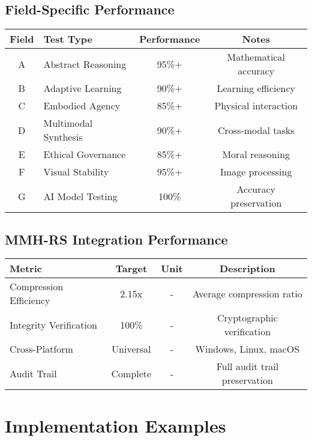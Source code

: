 \documentclass[12pt,a4paper]{article}
\begin{document}
\subsection{Field-Specific Performance}
\begin{center}
\begin{tabular}{|c|l|c|c|}
\hline
\textbf{Field} & \textbf{Test Type} & \textbf{Performance} & \textbf{Notes} \\
\hline
A & Abstract Reasoning & 95\%+ & Mathematical accuracy \\
B & Adaptive Learning & 90\%+ & Learning efficiency \\
C & Embodied Agency & 85\%+ & Physical interaction \\
D & Multimodal Synthesis & 90\%+ & Cross-modal tasks \\
E & Ethical Governance & 85\%+ & Moral reasoning \\
F & Visual Stability & 95\%+ & Image processing \\
G & AI Model Testing & 100\% & Accuracy preservation \\
\hline
\end{tabular}
\end{center}

\subsection{MMH-RS Integration Performance}
\begin{center}
\begin{tabular}{|l|c|c|c|}
\hline
\textbf{Metric} & \textbf{Target} & \textbf{Unit} & \textbf{Description} \\
\hline
Compression Efficiency & 2.15x & - & Average compression ratio \\
Integrity Verification & 100\% & - & Cryptographic verification \\
Cross-Platform & Universal & - & Windows, Linux, macOS \\
Audit Trail & Complete & - & Full audit trail preservation \\
\hline
\end{tabular}
\end{center}

\newpage

\section{Implementation Examples}
\end{document}
